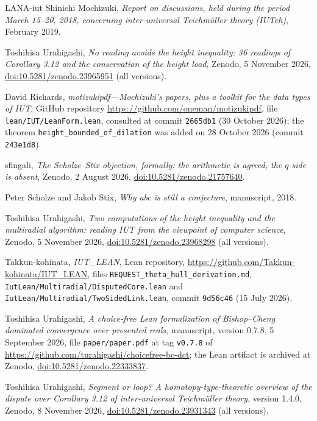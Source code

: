 \documentclass[11pt,a4paper]{article}
\theoremstyle{plain}
\theoremstyle{definition}
\theoremstyle{remark}
\begin{document}
\begin{thebibliography}{LANA-iut}
Shinichi Mochizuki, \emph{Report on discussions, held during the period March 15--20, 2018, concerning inter-universal
{T}eichm\"uller theory ({IUTch})}, February 2019.

Toshihisa Urahigashi, \emph{No reading avoids the height inequality: 36 readings of {C}orollary 3.12 and the
conservation of the height load}, Zenodo, 5 November 2026,
\href{https://doi.org/10.5281/zenodo.23965951}{doi:10.5281/zenodo.23965951} (all versions).

David Richards, \emph{motizukipdf---{M}ochizuki's papers, plus a toolkit for the data types of {IUT}}, GitHub
repository \url{https://github.com/oneman/motizukipdf}, file \texttt{lean/IUT/LeanForm.lean}, consulted at commit
\texttt{2665db1} (30 October 2026); the theorem \texttt{height\_bounded\_of\_dilation} was added on 28 October 2026
(commit \texttt{243e1d8}).

sfingali, \emph{The {S}cholze--{S}tix objection, formally: the arithmetic is agreed, the $q$-side is absent}, Zenodo,
2 August 2026, \href{https://doi.org/10.5281/zenodo.21757640}{doi:10.5281/zenodo.21757640}.

Peter Scholze and Jakob Stix, \emph{Why abc is still a conjecture}, manuscript, 2018.

Toshihisa Urahigashi, \emph{Two computations of the height inequality and the multiradial algorithm: reading {IUT}
from the viewpoint of computer science}, Zenodo, 5 November 2026,
\href{https://doi.org/10.5281/zenodo.23968298}{doi:10.5281/zenodo.23968298} (all versions).

Takkun-kohinata, \emph{IUT\_LEAN}, Lean repository, \url{https://github.com/Takkun-kohinata/IUT_LEAN}, files
\texttt{REQUEST\_theta\_hull\_derivation.md}, \texttt{IutLean/Multiradial/DisputedCore.lean} and
\texttt{IutLean/Multiradial/TwoSidedLink.lean}, commit \texttt{9d56c46} (15 July 2026).

Toshihisa Urahigashi, \emph{A choice-free {L}ean formalization of {B}ishop--{C}heng dominated convergence over presented
reals}, manuscript, version 0.7.8, 5 September 2026, file \texttt{paper/paper.pdf} at tag \texttt{v0.7.8} of
\url{https://github.com/turahigashi/choicefree-bc-dct}; the Lean artifact is archived at Zenodo,
\href{https://doi.org/10.5281/zenodo.22333837}{doi:10.5281/zenodo.22333837}.

Toshihisa Urahigashi, \emph{Segment or loop? A homotopy-type-theoretic overview of the dispute over {C}orollary 3.12 of
inter-universal {T}eichm\"uller theory}, version 1.4.0, Zenodo, 8 November 2026,
\href{https://doi.org/10.5281/zenodo.23931343}{doi:10.5281/zenodo.23931343} (all versions).


\end{thebibliography}
\end{document}
